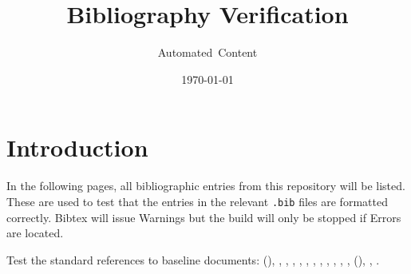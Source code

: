 \documentclass[DM,toc]{lsstdoc}
\title[Bib testing]{Bibliography Verification}
\author{Automated~Content}
\date{\today}
\begin{document}
\maketitle

\section{Introduction}

In the following pages, all bibliographic entries from this repository will be listed.
These are used to test that the entries in the relevant \texttt{.bib} files are formatted correctly.
Bibtex will issue Warnings but the build will only be stopped if Errors are located.

Test the standard references to baseline documents: (\SRD), \DPDD, \LSR, \OSS, \DMSR, \appsUMLdomain, \appsUMLusecase, \SUI, \DMSD, \MOPSD, \DMMD, \DMOps, (\SDQAP), \NewPCP, \UCAL.


\nocite{*}



\end{document}
